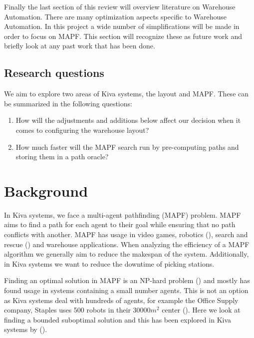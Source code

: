 \documentclass[a4paper,11pt]{article}
\begin{document}
Finally the last section of this review will overview literature on Warehouse Automation. There are many optimization aspects specific to Warehouse Automation. In this project a wide number of simplifications will be made in order to focus on MAPF. This section will recognize these as future work and briefly look at any past work that has been done.


\newpage
\subsection{Research questions}
We aim to explore two areas of Kiva systems, the layout and MAPF. These can be summarized in the following questions:

\begin{enumerate}
	\item How will the adjustments and additions below affect our decision when it comes to configuring the warehouse layout?

\item How much faster will the MAPF search run by pre-computing paths and storing them in a path oracle?
\end{enumerate}

\section{Background}
\label{background}

In Kiva systems, we face a multi-agent pathfinding (MAPF) problem. MAPF aims to find a path for each agent to their goal while ensuring that no path conflicts with another. MAPF has usage in video games, robotics (\cite{bennewitz2002finding}), search and rescue (\cite{konolige2006centibots}) and warehouse applications. When analyzing the efficiency of a MAPF algorithm we generally aim to reduce the makespan of the system. Additionally, in Kiva systems we want to reduce the downtime of picking stations.

Finding an optimal solution in MAPF is an NP-hard problem (\cite{yu2013structure}) and mostly has found usage in systems containing a small number agents. This is not an option as Kiva systems deal with hundreds of agents, for example the Office Supply company, Staples uses 500 robots in their $30000m^{2}$ center (\cite{guizzo2008three}). Here we look at finding a bounded suboptimal solution and this has been explored in Kiva systems by (\cite{cohen2016bounded}).
\end{document}
